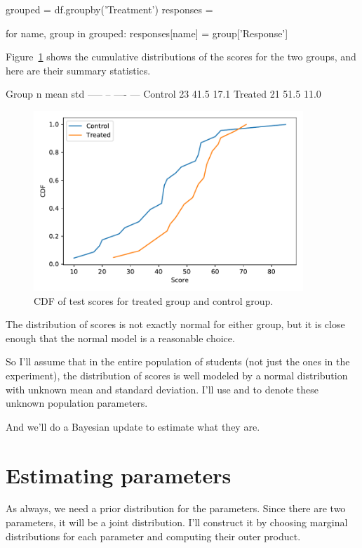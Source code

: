 \documentclass[12pt]{book}
\theoremstyle{exercise}
\begin{document}
\begin{code}
grouped = df.groupby('Treatment')
responses = {}

for name, group in grouped:
    responses[name] = group['Response']
\end{code}

Figure~\ref{fig11-01} shows the cumulative distributions of the scores for the two groups, and here are their summary statistics.

\begin{stdout}
Group      n     mean    std
-----      --    ----    ---    
Control    23    41.5    17.1
Treated    21    51.5    11.0
\end{stdout}

\begin{figure}
\centerline{\includegraphics[width=4in]{figs/fig11-01.pdf}}
\caption{CDF of test scores for treated group and control group.}
\label{fig11-01}
\end{figure}

The distribution of scores is not exactly normal for either group, but
it is close enough that the normal model is a reasonable choice.

So I'll assume that in the entire population of students (not just the
ones in the experiment), the distribution of scores is well modeled by a
normal distribution with unknown mean and standard deviation. I'll use
 and  to
denote these unknown population parameters.

And we'll do a Bayesian update to estimate what they are.

\section{Estimating parameters}

As always, we need a prior distribution for the parameters.
Since there are two parameters, it will be a joint distribution.
I'll construct it by choosing marginal distributions for each parameter
and computing their outer product.
\end{document}
